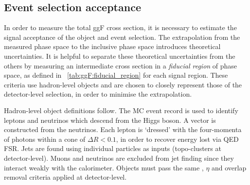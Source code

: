 \subsection{Event selection acceptance}
\label{sec:ggF:acc}

In order to measure the total ggF cross section, it is necessary to estimate the signal 
acceptance of the object and event selection. The extrapolation from the measured phase 
space to the inclusive phase space introduces theoretical uncertainties. It is helpful to 
separate these theoretical uncertainties from the others by measuring an intermediate cross 
section in a \textit{fiducial region} of phase space, as defined in 
\Table~\ref{tab:ggF:fiducial_region} for each signal region. These criteria use 
hadron-level objects and are chosen to closely represent those of the detector-level 
selection, in order to minimise the extrapolation.

Hadron-level object definitions follow. The MC event record is used to identify leptons 
and neutrinos which descend from the Higgs boson. A \truthmetvec vector is constructed from 
the neutrinos. Each lepton is `dressed' with the four-momenta of photons within a cone of 
$\Delta R < 0.1$, in order to recover energy lost via QED FSR. Jets are found using 
individual particles as inputs (\cf topo-clusters at detector-level). Muons and neutrinos 
are excluded from jet finding since they interact weakly with the calorimeter. Objects 
must pass the same \pt, $\eta$ and overlap removal criteria applied at detector-level.

